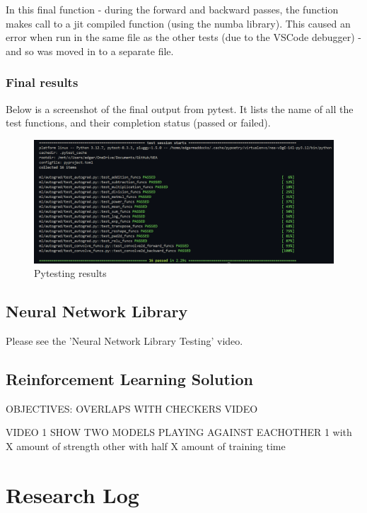 \documentclass{article}
\begin{document}
    In this final function - during the forward and backward passes, the function makes call to 
    a jit compiled function (using the numba library). This caused an error when run in
    the same file as the other tests (due to the VSCode debugger) - and so was moved in to a separate file.

    \subsubsection{Final results}

    Below is a screenshot of the final output from pytest. It lists the name of all the test functions,
    and their completion status (passed or failed).

    \begin{figure}[h]
        \centering
        \includegraphics[scale=0.5]{passing_tests.png}
        \caption{Pytesting results}
    \end{figure}
     
    \subsection{Neural Network Library}

    Please see the 'Neural Network Library Testing' video.

    \subsection{Reinforcement Learning Solution}

    OBJECTIVES:
    OVERLAPS WITH CHECKERS VIDEO

    VIDEO 1
    SHOW TWO MODELS PLAYING AGAINST EACHOTHER
    1 with X amount of strength other with half X amount of training time

    \section{Research Log}
\end{document}
